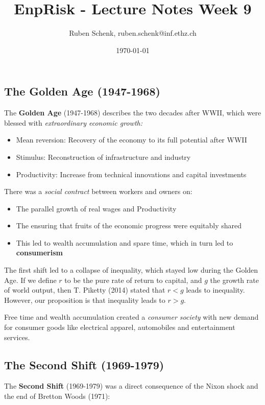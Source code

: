 \documentclass[a4paper]{extarticle}
\title{EnpRisk - Lecture Notes Week 9}
\author{Ruben Schenk, ruben.schenk@inf.ethz.ch}
\date{\today}
\begin{document}
\maketitle

\subsection{The Golden Age (1947-1968)}

The \textbf{Golden Age} (1947-1968) describes the two decades after WWII, which were blessed with \textit{extraordinary economic growth:}

\begin{itemize}
    \item Mean reversion: Recovery of the economy to its full potential after WWII
    \item Stimulus: Reconstruction of infrastructure and industry
    \item Productivity: Increase from technical innovations and capital investments
\end{itemize}

There was a \textit{social contract} between workers and owners on:

\begin{itemize}
    \item The parallel growth of real wages and Productivity
    \item The ensuring that fruits of the economic progress were equitably shared
    \item This led to wealth accumulation and spare time, which in turn led to \textbf{consumerism}
\end{itemize}

The first shift led to a collapse of inequality, which stayed low during the Golden Age. If we define $r$ to be the pure rate of return to capital, and $g$ the growth rate of world output, then T. Piketty (2014) stated that $r < g$ leads to inequality. However, our proposition is that inequality leads to $r > g$.

Free time and wealth accumulation created a \textit{consumer society} with new demand for consumer goods like electrical apparel, automobiles and entertainment services.

\subsection{The Second Shift (1969-1979)}

The \textbf{Second Shift} (1969-1979) was a direct consequence of the Nixon shock and the end of Bretton Woods (1971):
\end{document}
